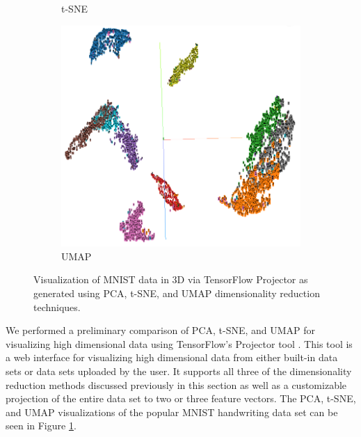\begin{figure}
\begin{subfigure}{0.3\textwidth}
  \caption{t-SNE}
\end{subfigure}
\hspace{0.02\textwidth}
\begin{subfigure}{0.3\textwidth}
  \centering
  \includegraphics[width=1.0\textwidth]{4/umap.png}
  \caption{UMAP}
\end{subfigure}
\caption{Visualization of MNIST data in 3D via TensorFlow Projector as generated using PCA, t-SNE, and UMAP dimensionality reduction techniques.}
\label{ch4:fig:data-viz}
\end{figure}

We performed a preliminary comparison of PCA, t-SNE, and UMAP for visualizing high dimensional data using TensorFlow's Projector tool \cite{TFProjector}. This tool is a web interface for visualizing high dimensional data from either built-in data sets or data sets uploaded by the user. It supports all three of the dimensionality reduction methods discussed previously in this section as well as a customizable projection of the entire data set to two or three feature vectors. The PCA, t-SNE, and UMAP visualizations of the popular MNIST handwriting data set can be seen in Figure \ref{ch4:fig:data-viz}. 